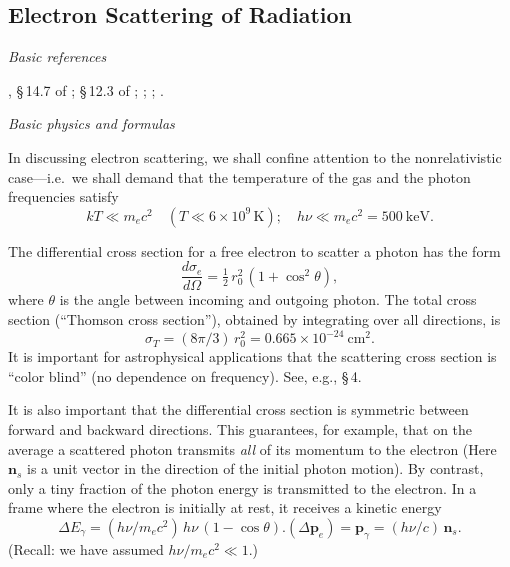 
\subsection{Electron Scattering of Radiation}
\label{sec:2.4}

\textit{Basic references}

\citet{Jackson1962}, \S\,14.7 of \citet{Jackson1962b};
\S\,12.3 of \citet{Leighton1959};
\citet{Kompaneets1957}; \citet{Weyman1965};
\citet{Sunyaev1973}.

\medskip
\noindent
\textit{Basic physics and formulas}

\medskip
\noindent
In discussing electron scattering, we shall confine attention to the nonrelativistic
case---i.e.\ we shall demand that the temperature of the gas and the photon
frequencies satisfy
\begin{equation}
kT \ll m_e c^2 \quad (T \ll 6 \times 10^9\,\text{K}); \quad
h\nu \ll m_e c^2 = 500~\text{keV}.
\tag{2.4.1}
\end{equation}

The differential cross section for a free electron to scatter a photon has the
form
\begin{equation}
\frac{d\sigma_e}{d\Omega} = \tfrac{1}{2}\,r_0^2\,(1 + \cos^2\theta),
\tag{2.4.2}
\end{equation}
where $\theta$ is the angle between incoming and outgoing photon.  The total
cross section (``Thomson cross section''), obtained by integrating over all
directions, is
\begin{equation}
\sigma_T = (8\pi/3)\,r_0^2 = 0.665 \times 10^{-24}~\text{cm}^2.
\tag{2.4.3}
\end{equation}
It is important for astrophysical applications that the scattering cross section
is ``color blind'' (no dependence on frequency).  See, e.g., \S\,4.

It is also important that the differential cross section is symmetric between
forward and backward directions.  This guarantees, for example, that on the
average a scattered photon transmits \textit{all} of its momentum to the electron
(Here $\mathbf{n}_s$ is a unit vector in the direction of the initial photon motion).  By
contrast, only a tiny fraction of the photon energy is transmitted to the electron.
In a frame where the electron is initially at rest, it receives a kinetic energy
\begin{subequations}
\begin{equation}
\Delta E_\gamma = (h\nu/m_e c^2)\,h\nu\,(1-\cos\theta).
\tag{2.4.4a}
\end{equation}
\begin{equation}
(\Delta\mathbf{p}_e) = \mathbf{p}_\gamma = (h\nu/c)\,\mathbf{n}_s.
\tag{2.4.4b}
\end{equation}
\end{subequations}
(Recall: we have assumed $h\nu/m_e c^2 \ll 1$.)

